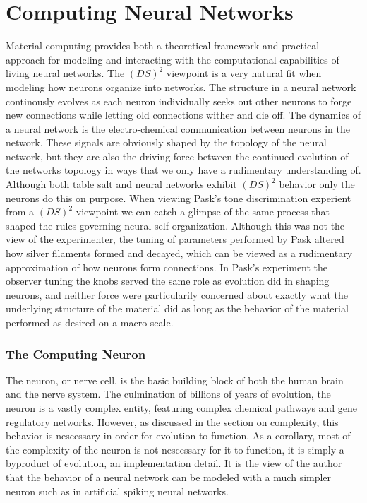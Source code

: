 \section{Computing Neural Networks}
Material computing provides both a theoretical framework and practical
approach for modeling and interacting with the computational capabilities of
living neural networks.
%
The $(DS)^2$ viewpoint is a very natural fit when modeling how neurons organize
into networks.
The structure in a neural network continously evolves as each neuron
individually seeks out other neurons to forge new connections while letting old
connections wither and die off.
The dynamics of a neural network is the electro-chemical communication between
neurons in the network.
These signals are obviously shaped by the topology of the neural network, but
they are also the driving force between the continued evolution of the networks
topology in ways that we only have a rudimentary understanding of.
%
Although both table salt and neural networks exhibit $(DS)^2$ behavior only the
neurons do this on purpose.
When viewing Pask's tone discrimination experient from a $(DS)^2$ viewpoint we
can catch a glimpse of the same process that shaped the rules governing neural
self organization.
Although this was not the view of the experimenter, the tuning of parameters
performed by Pask altered how silver filaments formed and decayed, which can be
viewed as a rudimentary approximation of how neurons form connections.
%
In Pask's experiment the observer tuning the knobs served the same role as
evolution did in shaping neurons, and neither force were particularily concerned
about exactly what the underlying structure of the material did as long as the
behavior of the material performed as desired on a macro-scale.
%
\subsubsection{The Computing Neuron}
The neuron, or nerve cell, is the basic building block of both the human brain
and the nerve system.
The culmination of billions of years of evolution, the neuron is a vastly
complex entity, featuring complex chemical pathways and gene regulatory
networks.
However, as discussed in the section on complexity, this behavior is nescessary
in order for evolution to function.
As a corollary, most of the complexity of the neuron is not nescessary for it to
function, it is simply a byproduct of evolution, an implementation detail.
It is the view of the author that the behavior of a neural network can be
modeled with a much simpler neuron such as in artificial spiking neural
networks.\par

